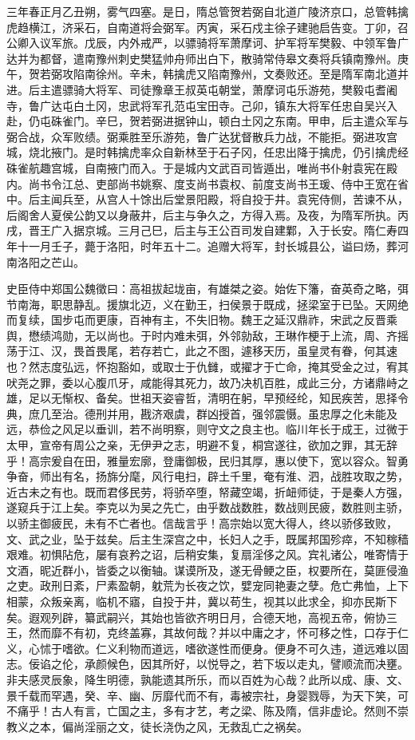 \documentclass[]{article}
\begin{document}
三年春正月乙丑朔，雾气四塞。是日，隋总管贺若弼自北道广陵济京口，总管韩擒虎趋横江，济采石，自南道将会弼军。丙寅，采石戍主徐子建驰启告变。丁卯，召公卿入议军旅。戊辰，内外戒严，以骠骑将军萧摩诃、护军将军樊毅、中领军鲁广达并为都督，遣南豫州刺史樊猛帅舟师出白下，散骑常侍皋文奏将兵镇南豫州。庚午，贺若弼攻陷南徐州。辛未，韩擒虎又陷南豫州，文奏败还。至是隋军南北道并进。后主遣骠骑大将军、司徒豫章王叔英屯朝堂，萧摩诃屯乐游苑，樊毅屯耆阇寺，鲁广达屯白土冈，忠武将军孔范屯宝田寺。己卯，镇东大将军任忠自吴兴入赴，仍屯硃雀门。辛巳，贺若弼进据钟山，顿白土冈之东南。甲申，后主遣众军与弼合战，众军败绩。弼乘胜至乐游苑，鲁广达犹督散兵力战，不能拒。弼进攻宫城，烧北掖门。是时韩擒虎率众自新林至于石子冈，任忠出降于擒虎，仍引擒虎经硃雀航趣宫城，自南掖门而入。于是城内文武百司皆遁出，唯尚书仆射袁宪在殿内。尚书令江总、吏部尚书姚察、度支尚书袁权、前度支尚书王瑗、侍中王宽在省中。后主闻兵至，从宫人十馀出后堂景阳殿，将自投于井。袁宪侍侧，苦谏不从，后阁舍人夏侯公韵又以身蔽井，后主与争久之，方得入焉。及夜，为隋军所执。丙戌，晋王广入据京城。三月己巳，后主与王公百司发自建鄴，入于长安。隋仁寿四年十一月壬子，薨于洛阳，时年五十二。追赠大将军，封长城县公，谥曰炀，葬河南洛阳之芒山。

史臣侍中郑国公魏徵曰：高祖拔起垅亩，有雄桀之姿。始佐下籓，奋英奇之略，弭节南海，职思静乱。援旗北迈，义在勤王，扫侯景于既成，拯梁室于已坠。天网绝而复续，国步屯而更康，百神有主，不失旧物。魏王之延汉鼎祚，宋武之反晋乘舆，懋绩鸿勋，无以尚也。于时内难未弭，外邻勍敌，王琳作梗于上流，周、齐摇荡于江、汉，畏首畏尾，若存若亡，此之不图，遽移天历，虽皇灵有眷，何其速也？然志度弘远，怀抱豁如，或取士于仇雠，或擢才于亡命，掩其受金之过，宥其吠尧之罪，委以心腹爪牙，咸能得其死力，故乃决机百胜，成此三分，方诸鼎峙之雄，足以无惭权、备矣。世祖天姿睿哲，清明在躬，早预经纶，知民疾苦，思择令典，庶几至治。德刑并用，戡济艰虞，群凶授首，强邻震慑。虽忠厚之化未能及远，恭俭之风足以垂训，若不尚明察，则守文之良主也。临川年长于成王，过微于太甲，宣帝有周公之亲，无伊尹之志，明避不复，桐宫遂往，欲加之罪，其无辞乎！高宗爰自在田，雅量宏廓，登庸御极，民归其厚，惠以使下，宽以容众。智勇争奋，师出有名，扬旆分麾，风行电扫，辟土千里，奄有淮、泗，战胜攻取之势，近古未之有也。既而君侈民劳，将骄卒堕，帑藏空竭，折衄师徒，于是秦人方强，遂窥兵于江上矣。李克以为吴之先亡，由乎数战数胜，数战则民疲，数胜则主骄，以骄主御疲民，未有不亡者也。信哉言乎！高宗始以宽大得人，终以骄侈致败，文、武之业，坠于兹矣。后主生深宫之中，长妇人之手，既属邦国殄瘁，不知稼穑艰难。初惧阽危，屡有哀矜之诏，后稍安集，复扇淫侈之风。宾礼诸公，唯寄情于文酒，昵近群小，皆委之以衡轴。谋谟所及，遂无骨鲠之臣，权要所在，莫匪侵渔之吏。政刑日紊，尸素盈朝，躭荒为长夜之饮，嬖宠同艳妻之孽。危亡弗恤，上下相蒙，众叛亲离，临机不寤，自投于井，冀以苟生，视其以此求全，抑亦民斯下矣。遐观列辟，纂武嗣兴，其始也皆欲齐明日月，合德天地，高视五帝，俯协三王，然而靡不有初，克终盖寡，其故何哉？并以中庸之才，怀可移之性，口存于仁义，心怵于嗜欲。仁义利物而道远，嗜欲遂性而便身。便身不可久违，道远难以固志。佞谄之伦，承颜候色，因其所好，以悦导之，若下坂以走丸，譬顺流而决壅。非夫感灵辰象，降生明德，孰能遗其所乐，而以百姓为心哉？此所以成、康、文、景千载而罕遇，癸、辛、幽、厉靡代而不有，毒被宗社，身婴戮辱，为天下笑，可不痛乎！古人有言，亡国之主，多有才艺，考之梁、陈及隋，信非虚论。然则不崇教义之本，偏尚淫丽之文，徒长浇伪之风，无救乱亡之祸矣。
\end{document}
